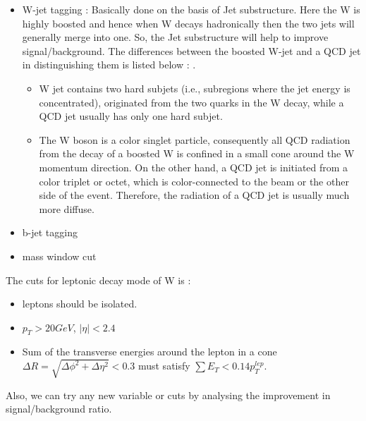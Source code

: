 	\begin{itemize}
		\item W-jet tagging : Basically done on the basis of Jet substructure. Here the W is highly boosted and hence when W decays hadronically then the two jets will generally merge into one. So, the Jet substructure will help to improve signal/background. The differences between the boosted W-jet and a QCD jet in distinguishing them is listed below : \cite{paper:arXiv:WWscat-WjetTag}. 
			\begin{itemize}
			\item W jet contains two hard subjets (i.e., subregions where the jet energy is concentrated), originated from the two quarks in the W decay, while a QCD jet usually has only one hard subjet.
			\item The W boson is a color singlet particle, consequently all QCD radiation from the decay of a boosted W is confined in a small cone around the W momentum direction. On the other hand, a QCD jet is initiated from a color triplet or octet, which is color-connected to the beam or the other side of the event. Therefore, the radiation of a QCD jet is usually much more diffuse.
			\end{itemize}
		\item b-jet tagging
		\item mass window cut
	\end{itemize}
The cuts for leptonic decay mode of W is :
	\begin{itemize}
	\item leptons should be isolated.
	\item $p_T>20GeV$, $|\eta|<2.4$
	\item Sum of the transverse energies around the lepton in a cone $\Delta R = \sqrt{\Delta \phi^2 + \Delta \eta^2} <0.3$ must satisfy $\sum E_T<0.14p_T^{lep}.$

	\end{itemize}
Also, we can try any new variable or cuts by analysing the improvement in signal/background ratio.


